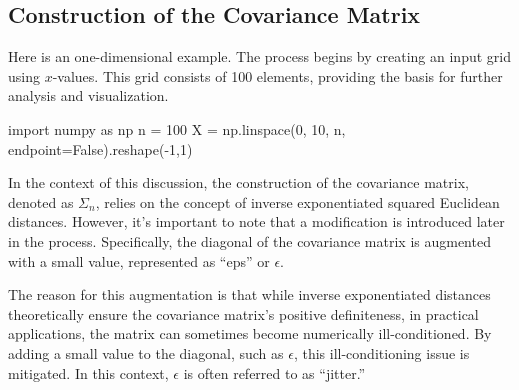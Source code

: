 \documentclass[
  letterpaper,
  DIV=11,
  numbers=noendperiod]{scrreprt}
\newenvironment{Shaded}{\begin{snugshade}}{\end{snugshade}}
\newcommand{\DecValTok}[1]{\textcolor[rgb]{0.68,0.00,0.00}{#1}}
\newcommand{\ImportTok}[1]{\textcolor[rgb]{0.00,0.46,0.62}{#1}}
\newcommand{\NormalTok}[1]{\textcolor[rgb]{0.00,0.23,0.31}{#1}}
\newcommand{\OperatorTok}[1]{\textcolor[rgb]{0.37,0.37,0.37}{#1}}
\newcommand{\VariableTok}[1]{\textcolor[rgb]{0.07,0.07,0.07}{#1}}
\begin{document}
\hypertarget{construction-of-the-covariance-matrix}{%
\subsection{Construction of the Covariance
Matrix}\label{construction-of-the-covariance-matrix}}

Here is an one-dimensional example. The process begins by creating an
input grid using \(x\)-values. This grid consists of 100 elements,
providing the basis for further analysis and visualization.

\begin{Shaded}
\begin{Highlighting}[]
\ImportTok{import}\NormalTok{ numpy }\ImportTok{as}\NormalTok{ np}
\NormalTok{n }\OperatorTok{=} \DecValTok{100}
\NormalTok{X }\OperatorTok{=}\NormalTok{ np.linspace(}\DecValTok{0}\NormalTok{, }\DecValTok{10}\NormalTok{, n, endpoint}\OperatorTok{=}\VariableTok{False}\NormalTok{).reshape(}\OperatorTok{{-}}\DecValTok{1}\NormalTok{,}\DecValTok{1}\NormalTok{)}
\end{Highlighting}
\end{Shaded}

In the context of this discussion, the construction of the covariance
matrix, denoted as \(\Sigma_n\), relies on the concept of inverse
exponentiated squared Euclidean distances. However, it's important to
note that a modification is introduced later in the process.
Specifically, the diagonal of the covariance matrix is augmented with a
small value, represented as ``eps'' or \(\epsilon\).

The reason for this augmentation is that while inverse exponentiated
distances theoretically ensure the covariance matrix's positive
definiteness, in practical applications, the matrix can sometimes become
numerically ill-conditioned. By adding a small value to the diagonal,
such as \(\epsilon\), this ill-conditioning issue is mitigated. In this
context, \(\epsilon\) is often referred to as ``jitter.''
\end{document}
